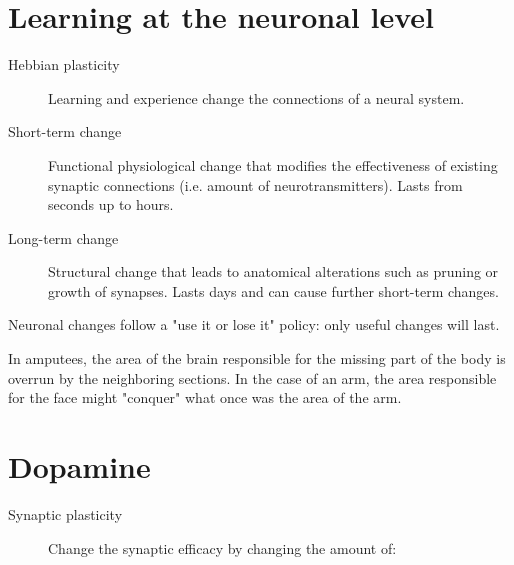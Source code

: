 \section{Learning at the neuronal level}

\begin{description}
    \item[Hebbian plasticity] 
        Learning and experience change the connections of a neural system.

    \item[Short-term change] 
        Functional physiological change that modifies the effectiveness of existing synaptic connections (i.e. amount of neurotransmitters).
        Lasts from seconds up to hours.

    \item[Long-term change] 
        Structural change that leads to anatomical alterations such as pruning or growth of synapses.
        Lasts days and can cause further short-term changes.
\end{description}

\begin{remark}
    Neuronal changes follow a "use it or lose it" policy:
    only useful changes will last.
\end{remark}

\begin{casestudy}
    In amputees, the area of the brain responsible for the missing part of the body is overrun by the neighboring sections.
    In the case of an arm, the area responsible for the face might "conquer" what once was the area of the arm.
\end{casestudy}



\section{Dopamine}

\begin{description}
    \item[Synaptic plasticity]
        Change the synaptic efficacy by changing the amount of:
\end{description}


